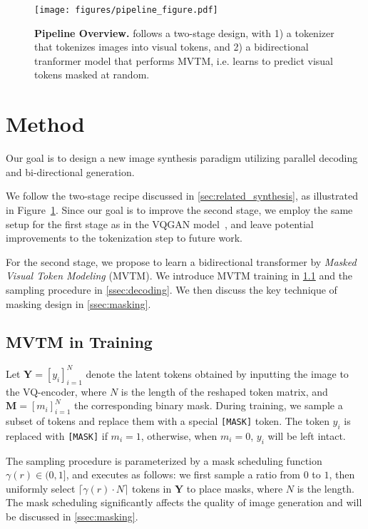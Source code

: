 \begin{figure}[!t]
    \centering
	\texttt{[image: figures/pipeline\_figure.pdf]}
    \caption{\textbf{Pipeline Overview.} \model follows a two-stage design, with 1) a tokenizer that tokenizes images into visual tokens, and 2) a bidirectional tranformer model that performs MVTM, i.e. learns to predict visual tokens masked at random.}
    \vspace{-3mm}
    \label{fig:pipeline}
\end{figure}\section{Method}
\label{sec:method}
Our goal is to design a new image synthesis paradigm utilizing parallel decoding and bi-directional generation.

We follow the two-stage recipe discussed in \ref{sec:related_synthesis}, as illustrated in Figure~\ref{fig:pipeline}. Since our goal is to improve the second stage, we employ the same setup for the first stage as in the VQGAN model~\cite{Esser21vqgan}, and leave potential improvements to the tokenization step to future work.

For the second stage, we propose to learn a bidirectional transformer by \textit{Masked Visual Token Modeling} (MVTM). We introduce MVTM training in \ref{ssec:model} and the sampling procedure in \ref{ssec:decoding}. We then discuss the key technique of masking design in \ref{ssec:masking}. 

\subsection{MVTM in Training}
\label{ssec:model}
\newcommand{\unknownmask}[0]{{\mathbf{M}}}
\newcommand{\mathy}[0]{{\mathbf{Y}}}
\newcommand{\knownmask}[0]{{\overline{\mathbf{M}}}}
Let $\mathy=[y_i]_{i=1}^N$ denote the latent tokens obtained by inputting the image to the VQ-encoder, where $N$ is the length of the reshaped token matrix, and $\unknownmask=[m_i]_{i=1}^N$ the corresponding binary mask. During training, we sample a subset of tokens and replace them with a special \texttt{[MASK]} token. The token $y_i$ is replaced with \texttt{[MASK]} if $m_i=1$, otherwise, when $m_i=0$, $y_i$ will be left intact. 

The sampling procedure is parameterized by a mask scheduling function $\gamma (r) \in (0,1]$, and executes as follows: we first sample a ratio from $0$ to $1$, then uniformly select $\lceil \gamma(r) \cdot N \rceil$ tokens in $\mathy$ to place masks, where $N$ is the length. The mask scheduling significantly affects the quality of image generation and will be discussed in \ref{ssec:masking}.

